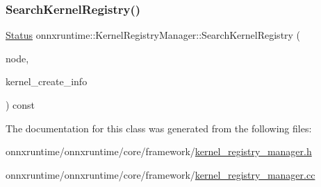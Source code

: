 \subsubsection{\texorpdfstring{Search\+Kernel\+Registry()}{SearchKernelRegistry()}}
{\footnotesize\ttfamily \mbox{\hyperlink{classonnxruntime_1_1common_1_1Status}{Status}} onnxruntime\+::\+Kernel\+Registry\+Manager\+::\+Search\+Kernel\+Registry (\begin{DoxyParamCaption}\item[{const \mbox{\hyperlink{classonnxruntime_1_1Node}{onnxruntime\+::\+Node}} \&}]{node,  }\item[{const \mbox{\hyperlink{structonnxruntime_1_1KernelCreateInfo}{Kernel\+Create\+Info}} $\ast$$\ast$}]{kernel\+\_\+create\+\_\+info }\end{DoxyParamCaption}) const}



The documentation for this class was generated from the following files\+:\begin{DoxyCompactItemize}
\item 
onnxruntime/onnxruntime/core/framework/\mbox{\hyperlink{kernel__registry__manager_8h}{kernel\+\_\+registry\+\_\+manager.\+h}}\item 
onnxruntime/onnxruntime/core/framework/\mbox{\hyperlink{kernel__registry__manager_8cc}{kernel\+\_\+registry\+\_\+manager.\+cc}}\end{DoxyCompactItemize}
